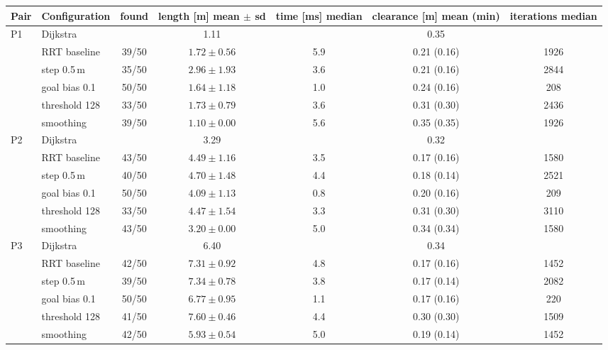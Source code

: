 \documentclass[10pt]{article}
\begin{document}
\begin{tabular}{llccccc}
\toprule
Pair & Configuration & found & length [m] mean $\pm$ sd & time [ms] median & clearance [m] mean (min) & iterations median \\
\midrule
P1 & Dijkstra      &       & 1.11            &     & 0.35        &      \\
    & RRT baseline & 39/50 & $1.72 \pm 0.56$ & 5.9 & 0.21 (0.16) & 1926 \\
    & step 0.5\,m & 35/50 & $2.96 \pm 1.93$ & 3.6 & 0.21 (0.16) & 2844 \\
    & goal bias 0.1 & 50/50 & $1.64 \pm 1.18$ & 1.0 & 0.24 (0.16) & 208  \\
    & threshold 128 & 33/50 & $1.73 \pm 0.79$ & 3.6 & 0.31 (0.30) & 2436 \\
    & smoothing & 39/50 & $1.10 \pm 0.00$ & 5.6 & 0.35 (0.35) & 1926 \\
P2 & Dijkstra      &       & 3.29            &     & 0.32        &      \\
    & RRT baseline & 43/50 & $4.49 \pm 1.16$ & 3.5 & 0.17 (0.16) & 1580 \\
    & step 0.5\,m & 40/50 & $4.70 \pm 1.48$ & 4.4 & 0.18 (0.14) & 2521 \\
    & goal bias 0.1 & 50/50 & $4.09 \pm 1.13$ & 0.8 & 0.20 (0.16) & 209  \\
    & threshold 128 & 33/50 & $4.47 \pm 1.54$ & 3.3 & 0.31 (0.30) & 3110 \\
    & smoothing & 43/50 & $3.20 \pm 0.00$ & 5.0 & 0.34 (0.34) & 1580 \\
P3 & Dijkstra      &       & 6.40            &     & 0.34        &      \\
    & RRT baseline & 42/50 & $7.31 \pm 0.92$ & 4.8 & 0.17 (0.16) & 1452 \\
    & step 0.5\,m & 39/50 & $7.34 \pm 0.78$ & 3.8 & 0.17 (0.14) & 2082 \\
    & goal bias 0.1 & 50/50 & $6.77 \pm 0.95$ & 1.1 & 0.17 (0.16) & 220  \\
    & threshold 128 & 41/50 & $7.60 \pm 0.46$ & 4.4 & 0.30 (0.30) & 1509 \\
    & smoothing & 42/50 & $5.93 \pm 0.54$ & 5.0 & 0.19 (0.14) & 1452 \\
\bottomrule
\end{tabular}
\end{document}
